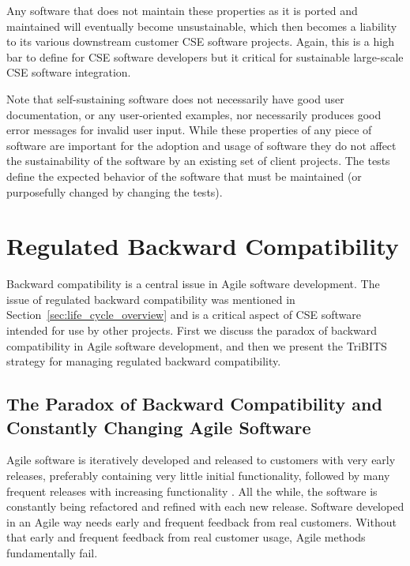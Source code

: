 \documentclass[11pt]{SANDreport}
\begin{document}
Any software that does not maintain these properties as it is ported
and maintained will eventually become unsustainable, which then
becomes a liability to its various downstream customer CSE software
projects.  Again, this is a high bar to define for CSE software
developers but it critical for sustainable large-scale CSE software
integration.

Note that self-sustaining software does not necessarily have good user
documentation, or any user-oriented examples, nor necessarily produces
good error messages for invalid user input.  While these properties of
any piece of software are important for the adoption and usage of
software they do not affect the sustainability of the software by an
existing set of client projects.  The tests define the expected
behavior of the software that must be maintained (or purposefully
changed by changing the tests).


%
{}\section{Regulated Backward Compatibility}
\label{sec:regulated_backard_compatibility}
%

Backward compatibility is a central issue in Agile software
development.  The issue of regulated backward compatibility was
mentioned in Section~\ref{sec:life_cycle_overview} and is a critical
aspect of CSE software intended for use by other projects.  First we discuss the paradox of
backward compatibility in Agile software development, and
then we present the  TriBITS strategy for managing regulated backward
compatibility.


%
{}\subsection{The Paradox of Backward Compatibility and Constantly
Changing Agile Software}
\label{sec:paradox_of_back_compat_agile}
%

Agile software is iteratively developed and released to customers with
very early releases, preferably containing very little initial
functionality, followed by many frequent releases with increasing
functionality {}\cite{AgileSoftwareDevelopment}.  All the while, the
software is constantly being refactored and refined with each new
release.  Software developed in an Agile way needs early and frequent
feedback from real customers.  Without that early and frequent
feedback from real customer usage, Agile methods fundamentally fail.
\end{document}
